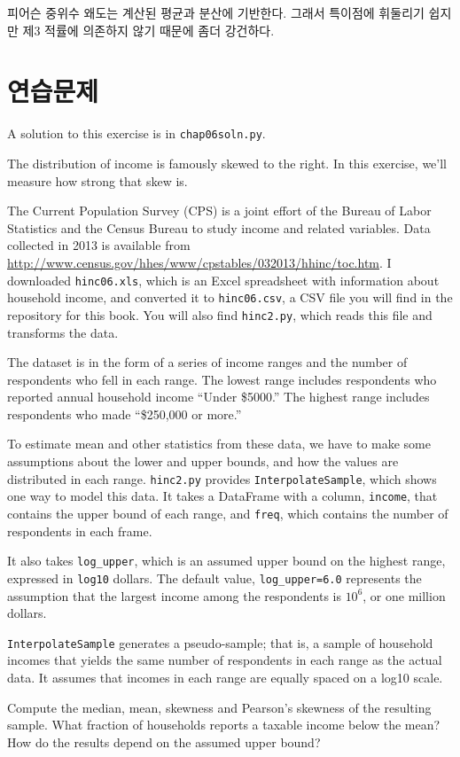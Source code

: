 
피어슨 중위수 왜도는 계산된 평균과 분산에 기반한다.
그래서 특이점에 휘둘리기 쉽지만 제3 적률에 의존하지 않기 때문에 좀더 강건하다.


\section{연습문제}

A solution to this exercise is in \verb"chap06soln.py".

\begin{exercise}

The distribution of income is famously skewed to the right.  In this
exercise, we'll measure how strong that skew is.

The Current Population Survey (CPS) is a joint effort of the Bureau
of Labor Statistics and the Census Bureau to study income and related
variables.  Data collected in 2013 is available from
\url{http://www.census.gov/hhes/www/cpstables/032013/hhinc/toc.htm}.
I downloaded {\tt hinc06.xls}, which is an Excel spreadsheet with
information about household income, and converted it to {\tt hinc06.csv},
a CSV file you will find in the repository for this book.  You
will also find {\tt hinc2.py}, which reads this file and transforms
the data.

The dataset is in the form of a series of income ranges and the number
of respondents who fell in each range.  The lowest range includes
respondents who reported annual household income ``Under \$5000.''
The highest range includes respondents who made ``\$250,000 or
more.''

To estimate mean and other statistics from these data, we have to
make some assumptions about the lower and upper bounds, and how
the values are distributed in each range.  {\tt hinc2.py} provides
{\tt InterpolateSample}, which shows one way to model
this data.  It takes a DataFrame with a column, {\tt income}, that
contains the upper bound of each range, and {\tt freq}, which contains
the number of respondents in each frame.

It also takes \verb"log_upper", which is an assumed upper bound
on the highest range, expressed in {\tt log10} dollars.  
The default value, \verb"log_upper=6.0" represents the assumption
that the largest income among the respondents is
$10^6$, or one million dollars.

{\tt InterpolateSample} generates a pseudo-sample; that is, a sample
of household incomes that yields the same number of respondents
in each range as the actual data.  It assumes that incomes in
each range are equally spaced on a log10 scale.

Compute the median, mean, skewness and Pearson's skewness of the
resulting sample.  What fraction of households reports a taxable
income below the mean?  How do the results depend on the assumed
upper bound?
\end{exercise}


